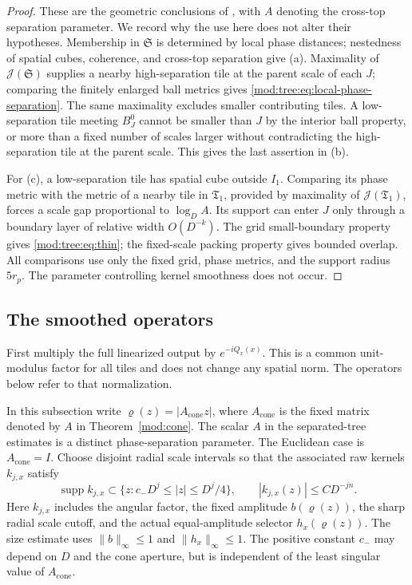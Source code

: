 \documentclass[11pt]{article}
\numberwithin{equation}{section}
\theoremstyle{remark}
\theoremstyle{definition}
\newcommand{\supp}{\operatorname{supp}}
\newcommand{\norm}[1]{\lVert #1\rVert}
\newcommand{\TT}{\mathfrak T}
\newcommand{\cJ}{\mathcal J}
\newcommand{\cS}{\mathfrak S}
\begin{document}
\begin{proof}
These are the geometric conclusions of \cite[Lemmas 6.13--6.14, 6.17, 6.21, 6.23--6.24]{BDJST}, with $A$ denoting the cross-top separation parameter. We record why the use here does not alter their hypotheses. Membership in $\cS$ is determined by local phase distances; nestedness of spatial cubes, coherence, and cross-top separation give (a). Maximality of $\cJ(\cS)$ supplies a nearby high-separation tile at the parent scale of each $J$; comparing the finitely enlarged ball metrics gives \eqref{mod:tree:eq:local-phase-separation}. The same maximality excludes smaller contributing tiles. A low-separation tile meeting $B_J^0$ cannot be smaller than $J$ by the interior ball property, or more than a fixed number of scales larger without contradicting the high-separation tile at the parent scale. This gives the last assertion in (b).

For (c), a low-separation tile has spatial cube outside $I_1$. Comparing its phase metric with the metric of a nearby tile in $\TT_1$, provided by maximality of $\cJ(\TT_1)$, forces a scale gap proportional to $\log_D A$. Its support can enter $J$ only through a boundary layer of relative width $O(D^{-k})$. The grid small-boundary property gives \eqref{mod:tree:eq:thin}; the fixed-scale packing property gives bounded overlap. All comparisons use only the fixed grid, phase metrics, and the support radius $5r_p$. The parameter controlling kernel smoothness does not occur.
\end{proof}

\subsection{The smoothed operators}\label{mod:tree:sec:smoothing}
First multiply the full linearized output by $e^{-iQ_x(x)}$. This is a common unit-modulus factor for all tiles and does not change any spatial norm. The operators below refer to that normalization.

In this subsection write $\varrho(z)=|A_{\mathrm{cone}}z|$, where $A_{\mathrm{cone}}$ is the fixed matrix denoted by $A$ in Theorem~\ref{mod:cone}. The scalar $A$ in the separated-tree estimates is a distinct phase-separation parameter. The Euclidean case is $A_{\mathrm{cone}}=I$. Choose disjoint radial scale intervals so that the associated raw kernels $k_{j,x}$ satisfy
\begin{equation}\label{mod:tree:eq:raw-size}
 \supp k_{j,x}\subset\{z:c_-D^j\le |z|\le D^j/4\},\qquad
 |k_{j,x}(z)|\le C D^{-jn}.
\end{equation}
Here $k_{j,x}$ includes the angular factor, the fixed amplitude $b(\varrho(z))$, the sharp radial scale cutoff, and the actual equal-amplitude selector $h_x(\varrho(z))$. The size estimate uses $\|b\|_\infty\le1$ and $\norm{h_x}_\infty\le1$. The positive constant $c_-$ may depend on $D$ and the cone aperture, but is independent of the least singular value of $A_{\mathrm{cone}}$.
\end{document}
